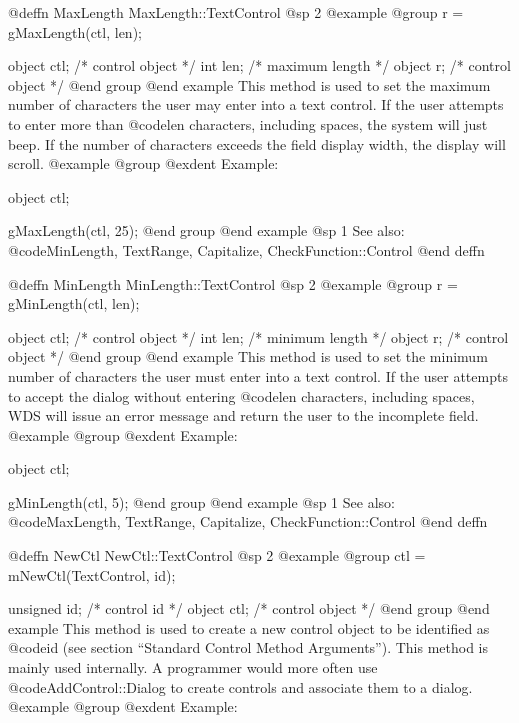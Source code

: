@deffn {MaxLength} MaxLength::TextControl
@sp 2
@example
@group
r = gMaxLength(ctl, len);

object  ctl;   /*  control object  */
int     len;   /*  maximum length  */
object  r;     /*  control object  */
@end group
@end example
This method is used to set the maximum number of characters the user may
enter into a text control.  If the user attempts to enter more than
@code{len} characters, including spaces, the system will just beep.  If
the number of characters exceeds the field display width, the display
will scroll.
@example
@group
@exdent Example:

object  ctl;

gMaxLength(ctl, 25);
@end group
@end example
@sp 1
See also:  @code{MinLength, TextRange, Capitalize, CheckFunction::Control}
@end deffn












@deffn {MinLength} MinLength::TextControl
@sp 2
@example
@group
r = gMinLength(ctl, len);

object  ctl;   /*  control object  */
int     len;   /*  minimum length  */
object  r;     /*  control object  */
@end group
@end example
This method is used to set the minimum number of characters the user must
enter into a text control.  If the user attempts to accept the dialog
without entering @code{len} characters, including spaces, WDS will
issue an error message and return the user to the incomplete field.
@example
@group
@exdent Example:

object  ctl;

gMinLength(ctl, 5);
@end group
@end example
@sp 1
See also:  @code{MaxLength, TextRange, Capitalize, CheckFunction::Control}
@end deffn









@deffn {NewCtl} NewCtl::TextControl
@sp 2
@example
@group
ctl = mNewCtl(TextControl, id);

unsigned  id;   /*  control id      */
object   ctl;   /*  control object  */
@end group
@end example
This method is used to create a new control object to be identified as
@code{id} (see section ``Standard Control Method Arguments'').  This
method is mainly used internally.  A programmer would more often
use @code{AddControl::Dialog} to create controls and associate them
to a dialog.
@example
@group
@exdent Example:

